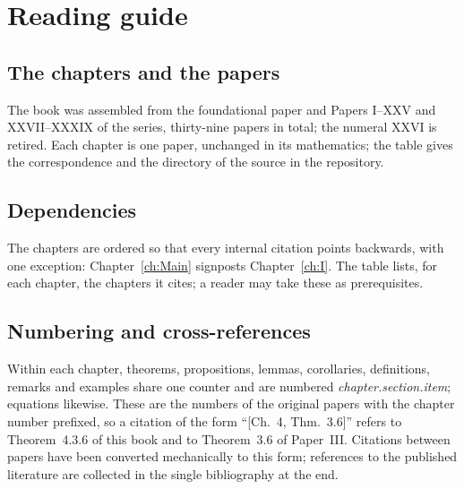\chapter*{Reading guide}

\section*{The chapters and the papers}
The book was assembled from the foundational paper and Papers I--XXV and XXVII--XXXIX of
the series, thirty-nine papers in total; the numeral XXVI is retired.
Each chapter is one paper, unchanged in its mathematics; the table gives the
correspondence and the directory of the source in the repository.



\section*{Dependencies}
The chapters are ordered so that every internal citation points backwards, with one
exception: Chapter~\ref{ch:Main} signposts Chapter~\ref{ch:I}. The table lists, for each
chapter, the chapters it cites; a reader may take these as prerequisites.



\section*{Numbering and cross-references}
Within each chapter, theorems, propositions, lemmas, corollaries, definitions,
remarks and examples share one counter and are numbered \emph{chapter.section.item};
equations likewise. These are the numbers of the original papers with the chapter
number prefixed, so a citation of the form ``[Ch.~4, Thm.~3.6]'' refers to
Theorem~4.3.6 of this book and to Theorem~3.6 of Paper~III. Citations between
papers have been converted mechanically to this form; references to the
published literature are collected in the single bibliography at the end.

